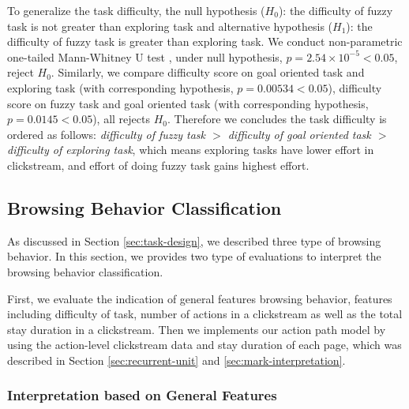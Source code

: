 To generalize the task difficulty, the null hypothesis ($H_0$): the difficulty of fuzzy task is not greater
than exploring task and alternative hypothesis ($H_1$): the difficulty of fuzzy task is greater than
exploring task. We conduct non-parametric one-tailed Mann-Whitney U test \cite{mann1947test}, 
under null hypothesis, $p=2.54\times 10^{-5} < 0.05$, reject $H_0$.
Similarly, we compare difficulty score on goal oriented task and exploring task (with corresponding hypothesis, 
$p=0.00534 < 0.05$), difficulty score on fuzzy task and goal oriented task (with corresponding hypothesis, 
$p=0.0145 < 0.05$), all rejects $H_0$. Therefore we concludes the task difficulty is ordered
as follows: \emph{difficulty of fuzzy task $>$ difficulty of goal oriented task $>$ difficulty of exploring task},
which means exploring tasks have lower effort in clickstream, and effort of doing fuzzy task gains highest effort.

\subsection{Browsing Behavior Classification}

As discussed in Section \ref{sec:task-design}, we described three type of browsing behavior. 
In this section, we provides two type of evaluations to interpret the browsing behavior classification.

First, we evaluate the indication of general features browsing behavior,
features including difficulty of task, number of actions in a clickstream as well as the total stay duration in a clickstream.
Then we implements our action path model by using the action-level clickstream data and stay duration of each page,
which was described in Section \ref{sec:recurrent-unit} and \ref{sec:mark-interpretation}.

\subsubsection{Interpretation based on General Features}
\label{sec:inter-general-feature}



